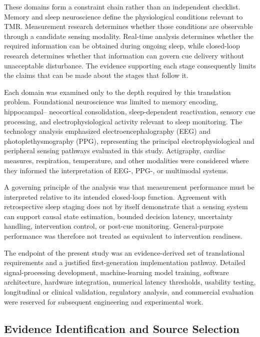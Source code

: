 These domains form a constraint chain rather than an independent checklist.
Memory and sleep neuroscience define the physiological conditions relevant to
TMR. Measurement research determines whether those conditions are observable
through a candidate sensing modality. Real-time analysis determines whether the
required information can be obtained during ongoing sleep, while closed-loop
research determines whether that information can govern cue delivery without
unacceptable disturbance. The evidence supporting each stage consequently
limits the claims that can be made about the stages that follow it.

Each domain was examined only to the depth required by this translation problem.
Foundational neuroscience was limited to memory encoding, hippocampal--
neocortical consolidation, sleep-dependent reactivation, sensory cue processing,
and electrophysiological activity relevant to sleep monitoring. The technology
analysis emphasized electroencephalography (EEG) and
photoplethysmography (PPG), representing the principal electrophysiological and
peripheral sensing pathways evaluated in this study. Actigraphy, cardiac
measures, respiration, temperature, and other modalities were considered where
they informed the interpretation of EEG-, PPG-, or multimodal systems.

A governing principle of the analysis was that measurement performance must be
interpreted relative to its intended closed-loop function. Agreement with
retrospective sleep staging does not by itself demonstrate that a sensing system
can support causal state estimation, bounded decision latency, uncertainty
handling, intervention control, or post-cue monitoring. General-purpose
performance was therefore not treated as equivalent to intervention readiness.

The endpoint of the present study was an evidence-derived set of translational
requirements and a justified first-generation implementation pathway. Detailed
signal-processing development, machine-learning model training, software
architecture, hardware integration, numerical latency thresholds, usability
testing, longitudinal or clinical validation, regulatory analysis, and
commercial evaluation were reserved for subsequent engineering and experimental
work.


\subsection{Evidence Identification and Source Selection}

